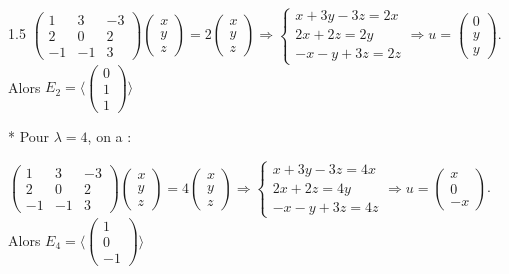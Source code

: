 \documentclass[12pt]{article}
\begin{document}
\begin{spacing}{1.5}
$\begin{pmatrix}
1 & 3 & -3 \\ 
2 & 0 & 2 \\ 
-1 & -1 & 3
\end{pmatrix}\begin{pmatrix}
x \\ 
y \\ 
z
\end{pmatrix}=2\begin{pmatrix}
x \\ 
y \\ 
z
\end{pmatrix}\Rightarrow\begin{cases}
x+3y-3z=2x\\
2x+2z=2y\\
-x-y+3z=2z
\end{cases}\Rightarrow  u=\begin{pmatrix}
0 \\ 
y \\ 
y
\end{pmatrix}$. Alors $E_{2}=\langle \begin{pmatrix}
0 \\ 
1 \\ 
1
\end{pmatrix}\rangle$

* Pour $\lambda=4$, on a :

$\begin{pmatrix}
1 & 3 & -3 \\ 
2 & 0 & 2 \\ 
-1 & -1 & 3
\end{pmatrix}\begin{pmatrix}
x \\ 
y \\ 
z
\end{pmatrix}=4\begin{pmatrix}
x \\ 
y \\ 
z
\end{pmatrix}\Rightarrow\begin{cases}
x+3y-3z=4x\\
2x+2z=4y\\
-x-y+3z=4z
\end{cases}\Rightarrow u=\begin{pmatrix}
x \\ 
0 \\ 
-x
\end{pmatrix}$. Alors $E_{4}=\langle \begin{pmatrix}
1 \\ 
0 \\ 
-1
\end{pmatrix}\rangle$


\end{spacing}
\end{document}
